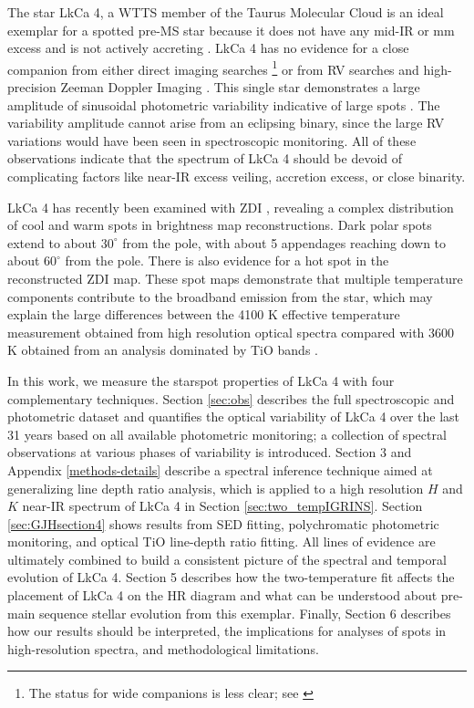 \documentclass[twocolumn]{emulateapj}%
\newcommand{\name}{LkCa 4 }
\begin{document}
The star LkCa 4, a WTTS member of the Taurus Molecular Cloud \citep{herbig86,strom89a,downes88,strom89b} is an ideal exemplar for a spotted pre-MS star because it does not have any mid-IR or mm excess \citep[\emph{e.g.}][]{andrews05,furlan06,buckle15} and is not actively accreting \citep[\emph{e.g.}][]{edwards06,cauley12}.  LkCa 4 has no evidence for a close companion from either direct imaging searches \citep{karr10,kraus11,daemgen15}\footnote{The status for wide companions is less clear; see \citet{stauffer91,itoh08,kraus09,kraus11,herczeg14}} or from RV searches \citep{nguyen12} and high-precision Zeeman Doppler Imaging \citep{donati14}.  This single star demonstrates a large amplitude of sinusoidal photometric variability indicative of large spots \citep{grankin08,xiao12}.  The variability amplitude cannot arise from an eclipsing binary, since the large RV variations would have been seen in spectroscopic monitoring.  All of these observations indicate that the spectrum of \name should be devoid of complicating factors like near-IR excess veiling, accretion excess, or close binarity.    

LkCa 4 has recently been examined with ZDI \citep{donati14}, revealing a complex distribution of cool and warm spots in brightness map reconstructions.  Dark polar spots extend to about $30^\circ$ from the pole, with about 5 appendages reaching down to about $60^\circ$ from the pole.  There is also evidence for a hot spot in the reconstructed ZDI map.  These spot maps demonstrate that multiple temperature components contribute to the broadband emission from the star, which may explain the large differences between the 4100 K effective temperature measurement obtained from high resolution optical spectra \citep{donati14} compared with 3600 K obtained from an analysis dominated by TiO bands \citep{herczeg14}.

In this work, we measure the starspot properties of LkCa 4 with four complementary techniques.  Section \ref{sec:obs} describes the full spectroscopic and photometric dataset and 
quantifies the optical variability of LkCa 4 over the last 31 years based on all available photometric monitoring; a collection of spectral observations at various phases of variability is introduced.  Section 3 and Appendix \ref{methods-details} describe a spectral inference technique aimed at generalizing line depth ratio analysis, which is applied to a high resolution $H$ and $K$ near-IR spectrum of LkCa 4 in Section \ref{sec:two_tempIGRINS}.  Section \ref{sec:GJHsection4} shows results from SED fitting, polychromatic photometric monitoring, and optical TiO line-depth ratio fitting.  All lines of evidence are ultimately combined to build a consistent picture of the spectral and temporal evolution of LkCa 4.  Section 5 describes how the two-temperature fit affects the placement of LkCa 4 on the HR diagram and what can be understood about pre-main sequence stellar evolution from this exemplar.  Finally, Section 6 describes how our results should be interpreted, the implications for analyses of spots in high-resolution spectra, and methodological limitations.
\end{document}
